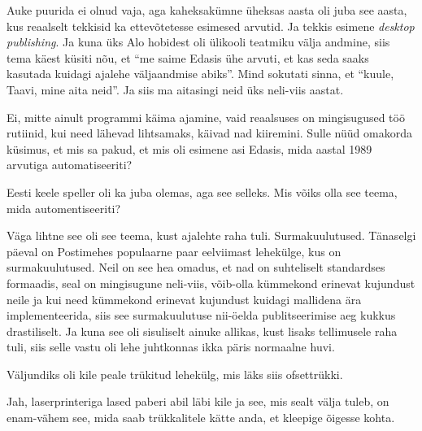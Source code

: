 
Auke puurida ei olnud vaja, aga kaheksakümne üheksas aasta oli juba see aasta, kus reaalselt tekkisid ka ettevõtetesse esimesed arvutid. Ja tekkis esimene \emph{desktop publishing}. Ja kuna üks Alo hobidest oli ülikooli teatmiku välja andmine, siis tema käest küsiti nõu, et \enquote{me saime Edasis ühe arvuti, et kas seda saaks kasutada kuidagi ajalehe väljaandmise abiks}. Mind sokutati sinna, et \enquote{kuule, Taavi, mine aita neid}. Ja siis ma aitasingi neid üks neli-viis aastat.


Ei, mitte ainult  programmi käima ajamine, vaid reaalsuses on mingisugused töö rutiinid,  kui need lähevad lihtsamaks, käivad nad kiiremini. Sulle nüüd omakorda küsimus, et mis sa pakud, et mis oli esimene asi Edasis, mida aastal 1989 arvutiga automatiseeriti?


Eesti keele speller oli ka juba olemas, aga see selleks. Mis võiks olla see teema, mida automentiseeriti?


Väga lihtne see oli see teema, kust ajalehte raha tuli. Surmakuulutused. Tänaselgi päeval on Postimehes populaarne paar eelviimast lehekülge, kus on  surmakuulutused. Neil on see hea omadus, et nad on suhteliselt standardses formaadis, seal on mingisugune neli-viis, võib-olla kümmekond erinevat kujundust neile ja kui need kümmekond erinevat kujundust kuidagi mallidena ära implementeerida, siis see surmakuulutuse nii-öelda publitseerimise aeg kukkus drastiliselt. Ja kuna see oli sisuliselt ainuke allikas, kust lisaks tellimusele raha tuli, siis selle vastu oli lehe juhtkonnas ikka päris normaalne huvi.


Väljundiks oli kile peale trükitud lehekülg, mis läks siis ofsettrükki.


Jah, laserprinteriga lased paberi abil läbi kile ja see, mis sealt välja tuleb, on enam-vähem see, mida saab trükkalitele kätte anda, et kleepige õigesse kohta.


